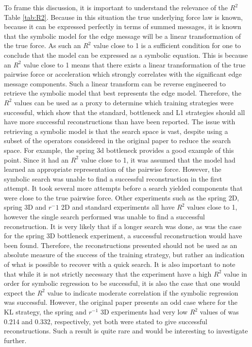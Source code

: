 \documentclass[11pt]{article}
\begin{document}
To frame this discussion, it is important to understand the relevance of the $R^2$ Table \ref{tab:R2}. Because in this situation the true underlying force law is known, because it can be expressed perfectly in terms of summed messages, it is known that the symbolic model for the edge message will be a linear transformation of the true force. As such an $R^2$ value close to 1 is a sufficient condition for one to conclude that the model can be expressed as a symbolic equation. This is because an $R^2$ value close to 1 means that there exists a linear transformation of the true pairwise force or acceleration which strongly correlates with the significant edge message components. Such a linear transform can be reverse engineered to retrieve the symbolic model that best represents the edge model. Therefore, the $R^2$ values can be used as a proxy to determine which training strategies were successful, which show that the standard, bottleneck and L1 strategies should all have more successful reconstructions than have been reported. The issue with retrieving a symbolic model is that the search space is vast, despite using a subset of the operators considered in the original paper to reduce the search space. For example, the spring 3d bottleneck provides a good example of this point. Since it had an $R^2$ value close to 1, it was assumed that the model had learned an appropriate representation of the pairwise force. However, the symbolic search was unable to find a successful reconstruction in the first attempt. It took several more attempts before a search yielded components that were close to the true pairwise force. Other experiments such as the spring 2D, spring 3D and $r^-1$ 2D and standard experiments all have $R^2$ values close to 1, however the single search performed was unable to find a successful reconstruction. It is very likely that if a longer search was done, as was the case for the spring 3D bottleneck experiment, a successful reconstruction would have been found. Therefore, the reconstructions presented should not be used as an absolute measure of the success of the training strategy, but rather an indication of what is possible to recover with a quick search. It is also important to note that while it is not strictly necessary that the experiment have a high $R^2$ value in order for symbolic regression to be successful, it is also the case that one would expect the $R^2$ value to indicate moderate correlation if the symbolic regression was successful. However, the original paper presents an odd case where for the KL strategy, the spring and $r^{-1}$ 3D experiments had very low $R^2$ values of was 0.214 and 0.332, respectively, yet both were stated to give successful reconstructions. Such a result is quite rare and would be interesting to investigate further. 
\end{document}
